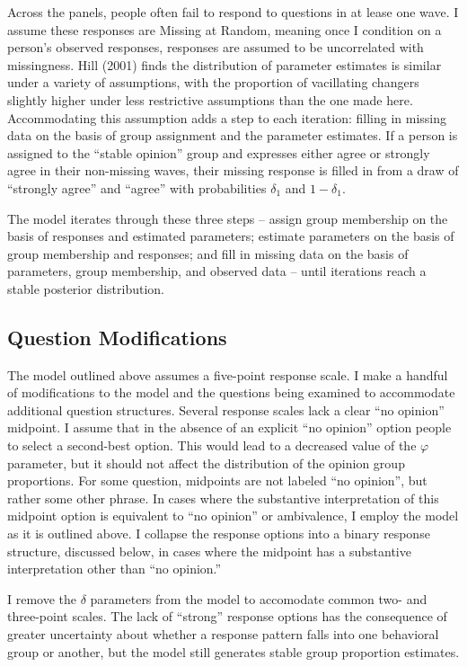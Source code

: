 \documentclass[12pt,]{article}
\begin{document}
Across the panels, people often fail to respond to questions in at lease one wave. I assume these responses are Missing at Random, meaning once I condition on a person's observed responses, responses are assumed to be uncorrelated with missingness. Hill (2001) finds the distribution of parameter estimates is similar under a variety of assumptions, with the proportion of vacillating changers slightly higher under less restrictive assumptions than the one made here. Accommodating this assumption adds a step to each iteration: filling in missing data on the basis of group assignment and the parameter estimates. If a person is assigned to the ``stable opinion'' group and expresses either agree or strongly agree in their non-missing waves, their missing response is filled in from a draw of ``strongly agree'' and ``agree'' with probabilities \(\delta_1\) and \(1-\delta_1\).

The model iterates through these three steps -- assign group membership on the basis of responses and estimated parameters; estimate parameters on the basis of group membership and responses; and fill in missing data on the basis of parameters, group membership, and observed data -- until iterations reach a stable posterior distribution.

\hypertarget{question-modifications}{%
\subsection{Question Modifications}\label{question-modifications}}

The model outlined above assumes a five-point response scale. I make a handful of modifications to the model and the questions being examined to accommodate additional question structures. Several response scales lack a clear ``no opinion'' midpoint. I assume that in the absence of an explicit ``no opinion'' option people to select a second-best option. This would lead to a decreased value of the \(\varphi\) parameter, but it should not affect the distribution of the opinion group proportions. For some question, midpoints are not labeled ``no opinion'', but rather some other phrase. In cases where the substantive interpretation of this midpoint option is equivalent to ``no opinion'' or ambivalence, I employ the model as it is outlined above. I collapse the response options into a binary response structure, discussed below, in cases where the midpoint has a substantive interpretation other than ``no opinion.''

I remove the \(\delta\) parameters from the model to accomodate common two- and three-point scales. The lack of ``strong'' response options has the consequence of greater uncertainty about whether a response pattern falls into one behavioral group or another, but the model still generates stable group proportion estimates.
\end{document}
